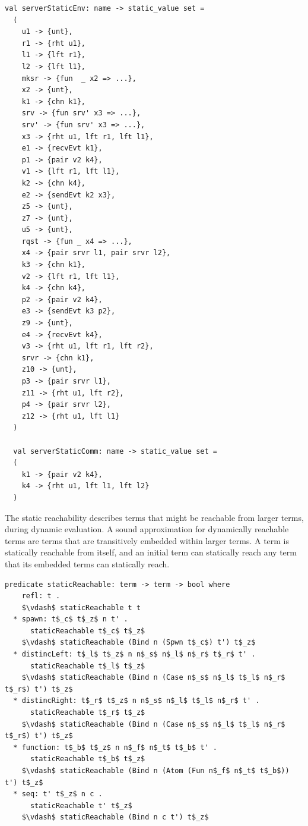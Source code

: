 \documentclass[letterpaper, 11pt]{extarticle}
\begin{document}
\begin{lstlisting}[language=sugar_lang, mathescape]
  val serverStaticEnv: name -> static_value set =
  (
    u1 -> {unt},
    r1 -> {rht u1},
    l1 -> {lft r1},
    l2 -> {lft l1},
    mksr -> {fun  _ x2 => ...},
    x2 -> {unt},
    k1 -> {chn k1},
    srv -> {fun srv' x3 => ...},
    srv' -> {fun srv' x3 => ...},
    x3 -> {rht u1, lft r1, lft l1},
    e1 -> {recvEvt k1},
    p1 -> {pair v2 k4},
    v1 -> {lft r1, lft l1},
    k2 -> {chn k4},
    e2 -> {sendEvt k2 x3},
    z5 -> {unt},
    z7 -> {unt},
    u5 -> {unt},
    rqst -> {fun _ x4 => ...},
    x4 -> {pair srvr l1, pair srvr l2},
    k3 -> {chn k1},
    v2 -> {lft r1, lft l1},
    k4 -> {chn k4},
    p2 -> {pair v2 k4},
    e3 -> {sendEvt k3 p2},
    z9 -> {unt},
    e4 -> {recvEvt k4},
    v3 -> {rht u1, lft r1, lft r2},
    srvr -> {chn k1},
    z10 -> {unt},
    p3 -> {pair srvr l1},
    z11 -> {rht u1, lft r2},
    p4 -> {pair srvr l2},
    z12 -> {rht u1, lft l1}
  )

  val serverStaticComm: name -> static_value set =
  (
    k1 -> {pair v2 k4},
    k4 -> {rht u1, lft l1, lft l2}
  )
\end{lstlisting}

The static reachability describes terms that might be reachable from larger
terms, during dynamic evaluation.
A sound approximation for dynamically reachable terms are
terms that are transitively embedded within larger terms.
A term is statically reachable from itself,
and an initial term can statically reach any term that its embedded terms can statically reach.

\begin{lstlisting}[language=logic, mathescape]
  predicate staticReachable: term -> term -> bool where
    refl: t .
    $\vdash$ staticReachable t t 
  * spawn: t$_c$ t$_z$ n t' . 
      staticReachable t$_c$ t$_z$
    $\vdash$ staticReachable (Bind n (Spwn t$_c$) t') t$_z$
  * distincLeft: t$_l$ t$_z$ n n$_s$ n$_l$ n$_r$ t$_r$ t' . 
      staticReachable t$_l$ t$_z$
    $\vdash$ staticReachable (Bind n (Case n$_s$ n$_l$ t$_l$ n$_r$ t$_r$) t') t$_z$
  * distincRight: t$_r$ t$_z$ n n$_s$ n$_l$ t$_l$ n$_r$ t' . 
      staticReachable t$_r$ t$_z$
    $\vdash$ staticReachable (Bind n (Case n$_s$ n$_l$ t$_l$ n$_r$ t$_r$) t') t$_z$
  * function: t$_b$ t$_z$ n n$_f$ n$_t$ t$_b$ t' . 
      staticReachable t$_b$ t$_z$
    $\vdash$ staticReachable (Bind n (Atom (Fun n$_f$ n$_t$ t$_b$)) t') t$_z$
  * seq: t' t$_z$ n c . 
      staticReachable t' t$_z$
    $\vdash$ staticReachable (Bind n c t') t$_z$
\end{lstlisting}
\end{document}
